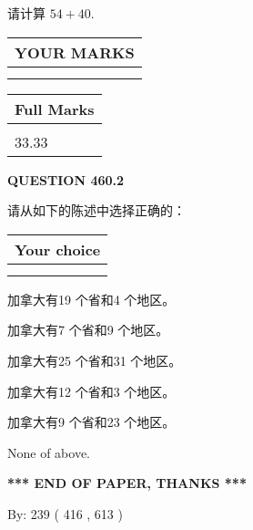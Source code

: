 \documentclass{ctexart}
\begin{document}
  
 
请计算 $ %
54 +  %
40 $.
 

 

 
  
\vspace{0.2in}
  
\noindent\begin{tabular}{|l|}
\hline
 YOUR MARKS  \\
\hline
 \\ 
 \\ 
\hline
\end{tabular}
\hspace{0.05in} \begin{tabular}{|l|}
\hline
 Full Marks  \\
\hline
 \\ 
33.33 \\
\hline
\end{tabular}
{\textbf{\Large{QUESTION
460.2 
}}}
  
  
请从如下的陈述中选择正确的：
  
  
\noindent\hspace{3.0in} \begin{tabular}{|l|}
\hline
Your choice \\
\hline
 \\ 
 \\ 
\hline
\end{tabular}
  
  
 
 
加拿大有19 个省和4 个地区。
 
 
加拿大有7 个省和9 个地区。
 
 
加拿大有25 个省和31 个地区。
 
 
加拿大有12 个省和3 个地区。
 
 
加拿大有9 个省和23 个地区。
 
 
 None of above.
 
 
   
   
 \vspace{0.2in}
 
   
   
   
   
\vspace{1.0in} 
{\textbf{\large{ *** END OF PAPER, THANKS *** }}} 
   
   
\hspace{1.0in} By: 
 239 ( 416 ,  613 )
   
\end{document}
